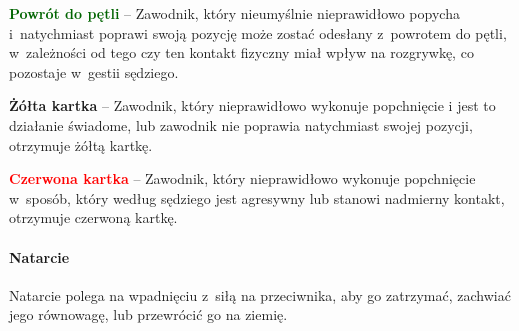 \documentclass[12pt,a4paper]{article}
\newcommand\redcard[1]{\bgroup\textcolor{red}{\textbf{#1}}}
\newcommand\yellowcard[1]{\bgroup\textcolor{darkyellow}{\textbf{#1}}}
\newcommand\other[1]{\bgroup\textcolor{darkgreen}{\textbf{#1}}}
\begin{document}
\other{Powrót do pętli} -- Zawodnik, który nieumyślnie nieprawidłowo
popycha i~natychmiast poprawi swoją pozycję może zostać odesłany z~powrotem do pętli, w~zależności od tego czy ten kontakt fizyczny miał
wpływ na rozgrywkę, co pozostaje w~gestii sędziego.

\yellowcard{Żółta kartka} -- Zawodnik, który nieprawidłowo wykonuje popchnięcie
i jest to działanie świadome, lub zawodnik nie poprawia natychmiast
swojej pozycji, otrzymuje żółtą kartkę.

\redcard{Czerwona kartka} -- Zawodnik, który nieprawidłowo wykonuje
popchnięcie w~sposób, który według sędziego jest agresywny lub stanowi
nadmierny kontakt, otrzymuje czerwoną kartkę.

\paragraph{Natarcie}
Natarcie polega na wpadnięciu z~siłą na
przeciwnika, aby go zatrzymać, zachwiać jego równowagę, lub przewrócić
go na ziemię.
\end{document}
